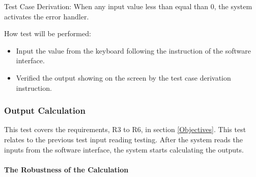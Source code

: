 \documentclass[12pt, titlepage]{article}
\begin{document}
\begin{enumerate}
Test Case Derivation: When any input value less than equal than 0, the system
activates the error handler. \\ 


How test will be performed: 

\begin{itemize} 
\item Input the value from the keyboard following the instruction of the
software interface. 
\item Verified the output showing on the screen by the test case derivation
instruction.
\end{itemize} 
\end{enumerate}

\subsubsection{Output Calculation}

This test covers the requirements, R3 to R6, in section \ref{Objectives}.
This test relates to the previous test input reading testing. After the 
system reads the inputs from the software interface, the system starts
calculating the outputs.



\paragraph{The Robustness of the Calculation}
\end{document}
